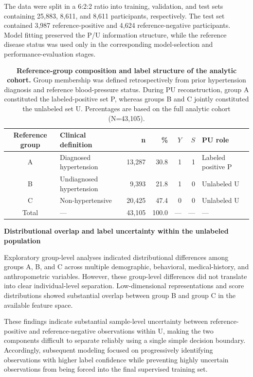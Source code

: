 \documentclass[10pt]{article}
\begin{document}
The data were split in a 6:2:2 ratio into training, validation, and test
sets containing 25,883, 8,611, and 8,611 participants, respectively. The
test set contained 3,987 reference-positive and 4,624 reference-negative
participants. Model fitting preserved the P/U information structure,
while the reference disease status was used only in the corresponding
model-selection and performance-evaluation stages.

\begin{table}[!t]
\caption{\textbf{Reference-group composition and label structure of the analytic cohort.} Group membership was defined retrospectively from prior hypertension diagnosis and reference blood-pressure status. During PU reconstruction, group A constituted the labeled-positive set P, whereas groups B and C jointly constituted the unlabeled set U. Percentages are based on the full analytic cohort (N=43,105).}
\label{tab:cohort}
\centering
\small
\setlength{\tabcolsep}{7.5pt}
\renewcommand{\arraystretch}{1.08}
\begin{tabular}{@{}clrrrrl@{}}
\toprule
\textbf{Reference group} & \textbf{Clinical definition} & \textbf{n} & \textbf{\%} & \textbf{$Y$} & \textbf{$S$} & \textbf{PU role} \\
\midrule
A & Diagnosed hypertension & 13,287 & 30.8 & 1 & 1 & Labeled positive P \\
B & Undiagnosed hypertension & 9,393 & 21.8 & 1 & 0 & Unlabeled U \\
C & Non-hypertensive & 20,425 & 47.4 & 0 & 0 & Unlabeled U \\
Total & --- & 43,105 & 100.0 & --- & --- & --- \\
\bottomrule
\end{tabular}
\end{table}

\textbf{Distributional overlap and label uncertainty within the
unlabeled population}

Exploratory group-level analyses indicated distributional differences
among groups A, B, and C across multiple demographic, behavioral,
medical-history, and anthropometric variables. However, these
group-level differences did not translate into clear individual-level
separation. Low-dimensional representations and score distributions
showed substantial overlap between group B and group C in the available
feature space.

These findings indicate substantial sample-level uncertainty between
reference-positive and reference-negative observations within U, making
the two components difficult to separate reliably using a single simple
decision boundary. Accordingly, subsequent modeling focused on
progressively identifying observations with higher label confidence
while preventing highly uncertain observations from being forced into
the final supervised training set.
\end{document}
